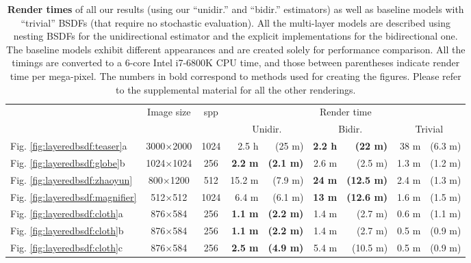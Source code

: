 \begin{table}[!ht]
	\centering
	\caption[Render times of all our results]{\label{tab:layeredbsdf:performance}
		\textbf{Render times} of all our results (using our ``unidir.'' and ``bidir.'' estimators) as well as baseline models with ``trivial'' BSDFs (that require no stochastic evaluation).
		All the multi-layer models are described using nesting BSDFs for the unidirectional estimator and the explicit implementations for the bidirectional one.
		The baseline models exhibit different appearances and are created solely for performance comparison.
		All the timings are converted to a 6-core Intel i7-6800K CPU time, and those between parentheses indicate render time per mega-pixel.
		The numbers in bold correspond to methods used for creating the figures.
		Please refer to the supplemental material for all the other renderings.
	}
   	\addtolength{\tabcolsep}{0pt} 
   	\small
	\begin{tabular}{l|c|c|rr|rr|rr}
	& \multirow{2}{*}{Image size}  & \multirow{2}{*}{spp} & \multicolumn{6}{c}{Render time}\\
	& & & \multicolumn{2}{c}{Unidir.} & \multicolumn{2}{c}{Bidir.} & \multicolumn{2}{c}{Trivial}\\
	\hline
	Fig. \ref{fig:layeredbsdf:teaser}a 			& 3000$\times$2000 & 1024 & 2.5 h  		   	& (25 m) 			& \textbf{2.2 h}& \textbf{(22 m)}   & 38 m  & (6.3 m)\\
	Fig. \ref{fig:layeredbsdf:globe}b 			& 1024$\times$1024 & 256  & \textbf{2.2 m} 	& \textbf{(2.1 m)} 	& 2.6 m 		& (2.5 m)   		& 1.3 m & (1.2 m)\\
	Fig. \ref{fig:layeredbsdf:zhaoyun} 			& 800$\times$1200  & 512  & 15.2 m   	   	& (7.9 m)		 	& \textbf{24 m} & \textbf{(12.5 m)} & 2.4 m & (1.3 m)\\
	Fig. \ref{fig:layeredbsdf:magnifier} 		& 512$\times$512   & 1024 & 6.4 m 			& (6.1 m) 			& \textbf{13 m} & \textbf{(12.6 m)} & 1.6 m & (1.5 m)\\
	Fig. \ref{fig:layeredbsdf:cloth}a 			& 876$\times$584   & 256  & \textbf{1.1 m} 	& \textbf{(2.2 m)} 	& 1.4 m 		& (2.7 m)   		& 0.6 m & (1.1 m)\\
	Fig. \ref{fig:layeredbsdf:cloth}b 			& 876$\times$584   & 256  & \textbf{1.1 m} 	& \textbf{(2.2 m)} 	& 1.4 m 		& (2.7 m)		   	& 0.5 m & (0.9 m)\\
	Fig. \ref{fig:layeredbsdf:cloth}c 			& 876$\times$584   & 256  & \textbf{2.5 m} 	& \textbf{(4.9 m)}	& 5.4 m 		& (10.5 m)  		& 0.5 m & (0.9 m)\\

\end{tabular}
\end{table}
